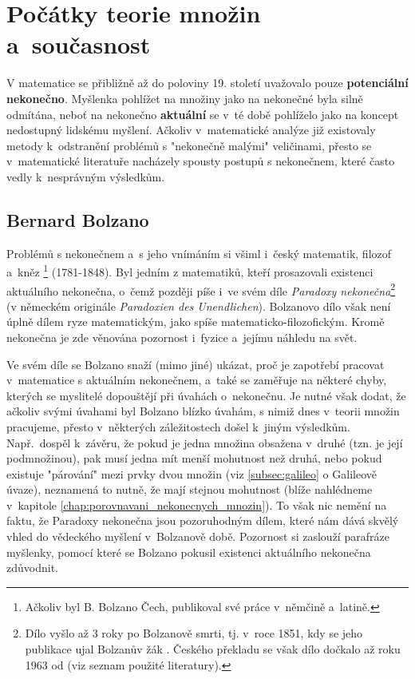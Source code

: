 \section{Počátky teorie množin a~současnost}

V matematice se přibližně až do poloviny 19. století uvažovalo pouze \textbf{potenciální nekonečno}. Myšlenka pohlížet na množiny jako na nekonečné byla silně odmítána, neboť na nekonečno \textbf{aktuální} se v~té době pohlíželo jako na koncept nedostupný lidskému myšlení. Ačkoliv v~matematické analýze již existovaly metody k~odstranění problémů s "nekonečně malými" veličinami, přesto se v~matematické literatuře nacházely spousty postupů s nekonečnem, které často vedly k~nesprávným výsledkům.
\subsection{Bernard Bolzano}\label{subsec:bolzano}
Problémů s nekonečnem a~s jeho vnímáním si všiml i~český matematik, filozof a~kněz \footnote{Ačkoliv byl B. Bolzano Čech, publikoval své práce v~němčině a~latině.} \mbox{(1781-1848)}. Byl jedním z matematiků, kteří prosazovali existenci aktuálního nekonečna, o~čemž později píše i~ve svém díle \emph{Paradoxy nekonečna}\footnote{Dílo vyšlo až 3 roky po Bolzanově smrti, tj. v~roce 1851, kdy se jeho publikace ujal Bolzanův žák . Českého překladu se však dílo dočkalo až roku 1963 od  (viz seznam použité literatury).} (v německém originále \emph{Paradoxien des Unendlichen}). Bolzanovo dílo však není úplně dílem ryze matematickým, jako spíše matematicko-filozofickým. Kromě nekonečna je zde věnována pozornost i~fyzice a~jejímu náhledu na svět.\par
Ve svém díle se Bolzano snaží (mimo jiné) ukázat, proč je zapotřebí pracovat v~matematice s aktuálním nekonečnem, a~také se zaměřuje na některé chyby, kterých se myslitelé dopouštějí při úvahách o~nekonečnu. Je nutné však dodat, že ačkoliv svými úvahami byl Bolzano blízko úvahám, s nimiž dnes v~teorii množin pracujeme, přesto v~některých záležitostech došel k~jiným výsledkům. Např.~dospěl k~závěru, že pokud je jedna množina obsažena v~druhé (tzn. je její podmnožinou), pak musí jedna mít menší mohutnost než druhá, nebo pokud existuje "párování" mezi prvky dvou množin (viz \ref{subsec:galileo}
o Galileově úvaze), neznamená to nutně, že mají stejnou mohutnost (blíže nahlédneme v~kapitole \ref{chap:porovnavani_nekonecnych_mnozin}). To však nic nemění na faktu, že Paradoxy nekonečna jsou pozoruhodným dílem, které nám dává skvělý vhled do vědeckého myšlení v~Bolzanově době. Pozornost si zaslouží parafráze myšlenky, pomocí které se Bolzano pokusil existenci aktuálního nekonečna zdůvodnit.

